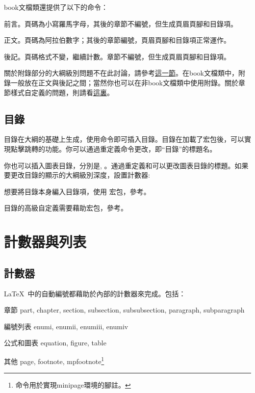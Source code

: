 book文檔類還提供了以下的命令：
\begin{para}
\item[\latexline{frontmatter}] 前言。頁碼為小寫羅馬字母，其後的章節不編號，但生成頁眉頁腳和目錄項。
\item[\latexline{mainmatter}] 正文。頁碼為阿拉伯數字；其後的章節編號，頁眉頁腳和目錄項正常運作。
\item[\latexline{backmatter}] 後記。頁碼格式不變，繼續計數。章節不編號，但生成頁眉頁腳和目錄項。
\end{para}

關於附錄部分的大綱級別問題不在此討論，請參考\hyperref[sec:appendix]{這一節}。在book文檔類中，附錄一般放在正文與後記之間；當然你也可以在非book文檔類中使用附錄。關於章節樣式自定義的問題，則請看\hyperref[sec:titlesec]{這裏}。

\subsection{目錄}
目錄在大綱的基礎上生成，使用命令即可插入目錄。目錄在加載了宏包後，可以實現點擊跳轉的功能。你可以通過重定義命令更改，即“目錄”的標題名。
\begin{latex}
\renewcommand{\contensname}{目錄}
\end{latex}

你也可以插入圖表目錄，分別是, 。通過重定義和可以更改圖表目錄的標題。如果要更改目錄的顯示的大綱級別深度，設置計數器:
\begin{latex}
\setcounter{tocdepth}{2} %
\end{latex}

想要將目錄本身編入目錄項，使用  宏包，參考\pageref{pkg:tocbibind}。

目錄的高級自定義需要藉助宏包，參考。

\section{計數器與列表}

\subsection{計數器}
\LaTeX\ 中的自動編號都藉助於內部的計數器來完成。包括：
\begin{fead}
\item[章節] part, chapter, section, subsection, subsubsection, paragraph, subparagraph
\item[編號列表] enumi, enumii, enumiii, enumiv
\item[公式和圖表] equation, figure, table
\item[其他] page, footnote, mpfootnote\footnote{命令用於實現minipage環境的腳註。}
\end{fead}

